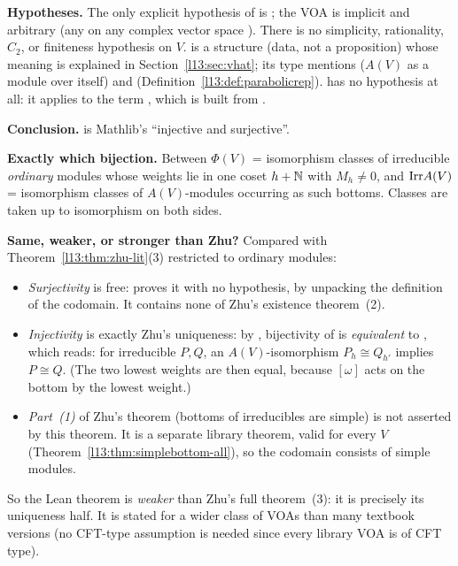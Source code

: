 \begin{dictionary}
\textbf{Hypotheses.} The only explicit hypothesis of  is ; the VOA  is implicit and
arbitrary (any  on any complex vector space ). There is no simplicity, rationality,
$C_2$, or finiteness hypothesis on $V$.  is a structure (data, not a proposition) whose meaning is explained in
Section~\ref{l13:sec:vhat}; its type mentions  ($A(V)$ as a module over itself) and
 (Definition~\ref{l13:def:parabolicrep}).  has no hypothesis at all:
it applies  to the term , which is built from .

\textbf{Conclusion.}  is Mathlib's ``injective and surjective''.

\textbf{Exactly which bijection.} Between $\Phi(V)$ = isomorphism classes of irreducible \emph{ordinary} modules whose
weights lie in one coset $h+{\mathbb{N}}$ with $M_h\neq0$, and $\mathrm{Irr} A(V)$ = isomorphism classes of $A(V)$-modules
occurring as such bottoms. Classes are taken up to isomorphism on both sides.

\textbf{Same, weaker, or stronger than Zhu?} Compared with Theorem~\ref{l13:thm:zhu-lit}(3) restricted to ordinary
modules:
\begin{itemize}
\item \emph{Surjectivity} is free:  proves it with no hypothesis, by unpacking the
  definition of the codomain. It contains none of Zhu's existence theorem~(2).
\item \emph{Injectivity} is exactly Zhu's uniqueness: by , bijectivity
  of  is \emph{equivalent} to , which reads: for irreducible $P,Q$, an
  $A(V)$-isomorphism $P_h\cong Q_{h'}$ implies $P\cong Q$. (The two lowest weights are then equal, because $[\omega]$ acts
  on the bottom by the lowest weight.)
\item \emph{Part~(1)} of Zhu's theorem (bottoms of irreducibles are simple) is not asserted by this theorem. It is a
  separate library theorem, valid for every $V$ (Theorem~\ref{l13:thm:simplebottom-all}), so the codomain consists of
  simple modules.
\end{itemize}
So the Lean theorem is \emph{weaker} than Zhu's full theorem~(3): it is precisely its uniqueness half. It is stated for a
wider class of VOAs than many textbook versions (no CFT-type assumption is needed since every library VOA is of CFT type).


\end{dictionary}
